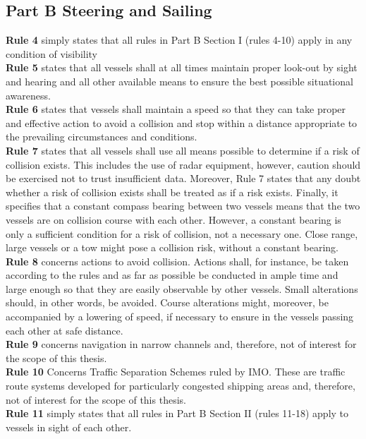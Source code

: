 \subsection{Part B Steering and Sailing}
\textbf{Rule 4} simply states that all rules in Part B Section I (rules 4-10) apply in any condition of visibility
\\
\textbf{Rule 5} states that all vessels shall at all times maintain proper look-out by sight and hearing and all other available means to ensure the best possible situational awareness.
\\
\textbf{Rule 6} states that vessels shall maintain a speed so that they can take proper and effective action to avoid a collision and stop within a distance appropriate to the prevailing circumstances and conditions.
\\
\textbf{Rule 7} states that all vessels shall use all means possible to determine if a risk of collision exists.
This includes the use of radar equipment, however, caution should be exercised not to trust insufficient data.
Moreover, Rule 7 states that any doubt whether a risk of collision exists shall be treated as if a risk exists.
Finally, it specifies that a constant compass bearing between two vessels means that the two vessels are on collision course with each other.
However, a constant bearing is only a sufficient condition for a risk of collision, not a necessary one.
Close range, large vessels or a tow might pose a collision risk, without a constant bearing.
\\
\textbf{Rule 8} concerns actions to avoid collision. Actions shall, for instance, be taken according to the rules and as far as possible be conducted in ample time and large enough so that they are easily observable by other vessels. Small alterations should, in other words, be avoided. Course alterations might, moreover, be accompanied by a lowering of speed, if necessary to ensure in the vessels passing each other at safe distance.
\\
\textbf{Rule 9} concerns navigation in narrow channels and, therefore,  not of interest for the scope of this thesis.
\\
\textbf{Rule 10} Concerns Traffic Separation Schemes ruled by IMO. These are traffic route systems developed for particularly congested shipping areas \cite{ships_routing_imo} and, therefore, not of interest for the scope of this thesis.
\\
\textbf{Rule 11} simply states that all rules in Part B Section II (rules 11-18) apply to vessels in sight of each other.
